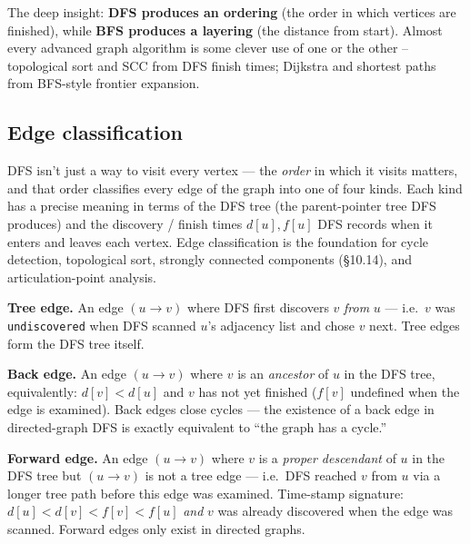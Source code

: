 \documentclass[11pt]{article}
\begin{document}
\begin{ideabox}
The deep insight: \textbf{DFS produces an ordering} (the order in which vertices are finished), while \textbf{BFS produces a layering} (the distance from start). Almost every advanced graph algorithm is some clever use of one or the other -- topological sort and SCC from DFS finish times; Dijkstra and shortest paths from BFS-style frontier expansion.
\end{ideabox}

\subsection*{Edge classification}

DFS isn't just a way to visit every vertex --- the \emph{order} in
which it visits matters, and that order classifies every edge of
the graph into one of four kinds. Each kind has a precise meaning
in terms of the DFS tree (the parent-pointer tree DFS produces)
and the discovery / finish times $d[u], f[u]$ DFS records when it
enters and leaves each vertex. Edge classification is the
foundation for cycle detection, topological sort, strongly
connected components (\S10.14), and articulation-point analysis.

\begin{defnbox}
\textbf{Tree edge.} An edge $(u \to v)$ where DFS first discovers
$v$ \emph{from} $u$ --- i.e.\ $v$ was \texttt{undiscovered} when
DFS scanned $u$'s adjacency list and chose $v$ next. Tree edges
form the DFS tree itself.
\end{defnbox}

\begin{defnbox}
\textbf{Back edge.} An edge $(u \to v)$ where $v$ is an
\emph{ancestor} of $u$ in the DFS tree, equivalently:
$d[v] < d[u]$ and $v$ has not yet finished
($f[v]$ undefined when the edge is examined). Back edges close
cycles --- the existence of a back edge in directed-graph DFS is
exactly equivalent to ``the graph has a cycle.''
\end{defnbox}

\begin{defnbox}
\textbf{Forward edge.} An edge $(u \to v)$ where $v$ is a
\emph{proper descendant} of $u$ in the DFS tree but $(u \to v)$
is not a tree edge --- i.e.\ DFS reached $v$ from $u$ via a longer
tree path before this edge was examined.
Time-stamp signature: $d[u] < d[v] < f[v] < f[u]$ \emph{and} $v$
was already discovered when the edge was scanned.
Forward edges only exist in directed graphs.
\end{defnbox}
\end{document}
